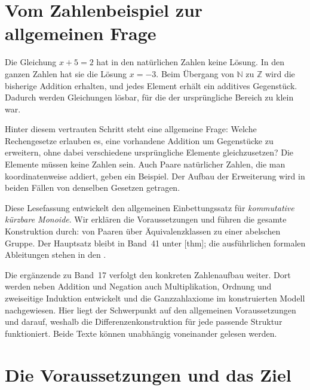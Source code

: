 \par{}
\hypertarget{differences.reading.problem}{}
\section*{Vom Zahlenbeispiel zur allgemeinen Frage}

Die Gleichung \(x+5=2\) hat in den natürlichen Zahlen keine Lösung.
In den ganzen Zahlen hat sie die Lösung \(x=-3\). Beim Übergang
von \(\mathbb N\) zu \(\mathbb Z\) wird die bisherige Addition
erhalten, und jedes Element erhält ein additives Gegenstück.
Dadurch werden Gleichungen lösbar, für die der ursprüngliche Bereich
zu klein war.

Hinter diesem vertrauten Schritt steht eine allgemeine Frage:
Welche Rechengesetze erlauben es, eine vorhandene Addition um
Gegenstücke zu erweitern, ohne dabei verschiedene ursprüngliche
Elemente gleichzusetzen? Die Elemente müssen keine Zahlen sein.
Auch Paare natürlicher Zahlen, die man koordinatenweise addiert,
geben ein Beispiel. Der Aufbau der Erweiterung wird in beiden
Fällen von denselben Gesetzen getragen.

Diese Lesefassung entwickelt den allgemeinen Einbettungssatz für
\emph{kommutative kürzbare Monoide}. Wir erklären die Voraussetzungen
und führen die gesamte Konstruktion durch: von Paaren über
Äquivalenzklassen zu einer abelschen Gruppe. Der Hauptsatz bleibt
in Band~41 unter
[thm]; die
ausführlichen formalen Ableitungen stehen in den
\DifferencesProofsLink{}.

Die ergänzende \IntegersReadingLink{} zu Band~17 verfolgt den
konkreten Zahlenaufbau weiter. Dort werden neben Addition und
Negation auch Multiplikation, Ordnung und zweiseitige Induktion
entwickelt und die Ganzzahlaxiome im konstruierten Modell
nachgewiesen. Hier liegt der Schwerpunkt auf den allgemeinen
Voraussetzungen und darauf, weshalb die Differenzenkonstruktion
für jede passende Struktur funktioniert. Beide Texte können
unabhängig voneinander gelesen werden.

\par{}
\hypertarget{differences.reading.general}{}
\section*{Die Voraussetzungen und das Ziel}

